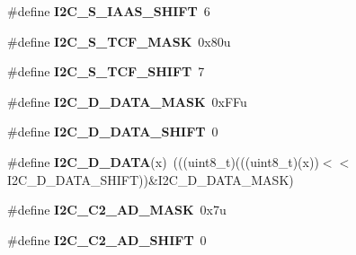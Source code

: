 \begin{DoxyCompactItemize}
\item 
\#define {\bfseries I2\+C\+\_\+\+S\+\_\+\+I\+A\+A\+S\+\_\+\+S\+H\+I\+FT}~6\hypertarget{group__I2C__Register__Masks_gaeef3ccc64a102f940ad82af4c5558381}{}\label{group__I2C__Register__Masks_gaeef3ccc64a102f940ad82af4c5558381}

\item 
\#define {\bfseries I2\+C\+\_\+\+S\+\_\+\+T\+C\+F\+\_\+\+M\+A\+SK}~0x80u\hypertarget{group__I2C__Register__Masks_ga20501abab9a2b23ac99fa69e87b2730d}{}\label{group__I2C__Register__Masks_ga20501abab9a2b23ac99fa69e87b2730d}

\item 
\#define {\bfseries I2\+C\+\_\+\+S\+\_\+\+T\+C\+F\+\_\+\+S\+H\+I\+FT}~7\hypertarget{group__I2C__Register__Masks_ga030264ea4205860abb6a32331d84cef3}{}\label{group__I2C__Register__Masks_ga030264ea4205860abb6a32331d84cef3}

\item 
\#define {\bfseries I2\+C\+\_\+\+D\+\_\+\+D\+A\+T\+A\+\_\+\+M\+A\+SK}~0x\+F\+Fu\hypertarget{group__I2C__Register__Masks_gaeb11bc3736eba5b805bdc4bced7edb2e}{}\label{group__I2C__Register__Masks_gaeb11bc3736eba5b805bdc4bced7edb2e}

\item 
\#define {\bfseries I2\+C\+\_\+\+D\+\_\+\+D\+A\+T\+A\+\_\+\+S\+H\+I\+FT}~0\hypertarget{group__I2C__Register__Masks_gac9b220edf37227949c367bf455d11a04}{}\label{group__I2C__Register__Masks_gac9b220edf37227949c367bf455d11a04}

\item 
\#define {\bfseries I2\+C\+\_\+\+D\+\_\+\+D\+A\+TA}(x)~(((uint8\+\_\+t)(((uint8\+\_\+t)(x))$<$$<$I2\+C\+\_\+\+D\+\_\+\+D\+A\+T\+A\+\_\+\+S\+H\+I\+FT))\&I2\+C\+\_\+\+D\+\_\+\+D\+A\+T\+A\+\_\+\+M\+A\+SK)\hypertarget{group__I2C__Register__Masks_ga7b68b1d5f1aa40f4bc5e9310e0a63754}{}\label{group__I2C__Register__Masks_ga7b68b1d5f1aa40f4bc5e9310e0a63754}

\item 
\#define {\bfseries I2\+C\+\_\+\+C2\+\_\+\+A\+D\+\_\+\+M\+A\+SK}~0x7u\hypertarget{group__I2C__Register__Masks_ga6c5f8db3bac4c51de9446448a8ad9072}{}\label{group__I2C__Register__Masks_ga6c5f8db3bac4c51de9446448a8ad9072}

\item 
\#define {\bfseries I2\+C\+\_\+\+C2\+\_\+\+A\+D\+\_\+\+S\+H\+I\+FT}~0\hypertarget{group__I2C__Register__Masks_gab875d484e12dc6ae427c2063430d1362}{}\label{group__I2C__Register__Masks_gab875d484e12dc6ae427c2063430d1362}


\end{DoxyCompactItemize}
